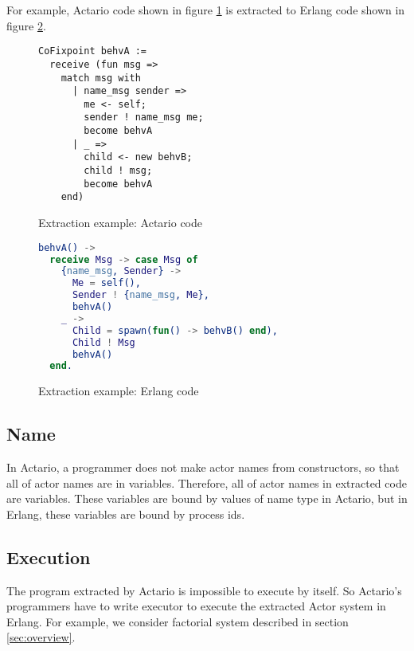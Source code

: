 For example, Actario code shown in figure \ref{coq:extractionex} is extracted to Erlang code shown in figure \ref{erl:extractionex}.

\begin{figure}[t]
  \begin{lstlisting}
CoFixpoint behvA :=
  receive (fun msg =>
    match msg with
      | name_msg sender =>
        me <- self;
        sender ! name_msg me;
        become behvA
      | _ =>
        child <- new behvB;
        child ! msg;
        become behvA
    end)
  \end{lstlisting}
  \caption{Extraction example: Actario code}\label{coq:extractionex}
\end{figure}

\begin{figure}[t]
  \begin{lstlisting}[language=erlang]
behvA() ->
  receive Msg -> case Msg of
    {name_msg, Sender} ->
      Me = self(),
      Sender ! {name_msg, Me},
      behvA()
    _ ->
      Child = spawn(fun() -> behvB() end),
      Child ! Msg
      behvA()
  end.
  \end{lstlisting}
  \caption{Extraction example: Erlang code}\label{erl:extractionex}
\end{figure}

\subsection{Name}
In Actario, a programmer does not make actor names from constructors, so that all of actor names are in variables.
Therefore, all of actor names in extracted code are variables.
These variables are bound by values of name type in Actario, but in Erlang, these variables are bound by process ids.

\subsection{Execution}
The program extracted by Actario is impossible to execute by itself.
So Actario's programmers have to write executor to execute the extracted Actor system in Erlang.
For example, we consider factorial system described in section \ref{sec:overview}.

